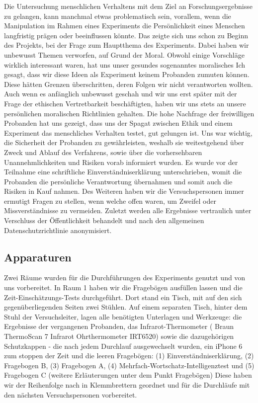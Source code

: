 \documentclass{Bericht}
\begin{document}
Die Untersuchung menschlichen Verhaltens mit dem Ziel an Forschungsergebnisse zu gelangen, kann manchmal etwas problematisch sein, vorallem, wenn die Manipulation im Rahmen eines Experiments die Persönlichkeit eines Menschen langfristig prägen oder beeinflussen könnte. Das zeigte sich uns schon zu Beginn des Projekts, bei der Frage zum Hauptthema des Experiments. Dabei haben wir unbewusst Themen verworfen, auf Grund der Moral. Obwohl einige Vorschläge wirklich interessant waren, hat uns unser gesundes sogenanntes moralisches Ich gesagt, dass wir diese Ideen als Experiment keinem Probanden zumuten können. Diese hätten Grenzen überschritten, deren Folgen wir nicht verantworten wollten. Auch wenn es anfänglich unbewusst geschah und wir uns erst später mit der Frage der ethischen Vertretbarkeit beschäftigten, haben wir uns stets an unsere persönlichen moralischen Richtlinien gehalten. Die hohe Nachfrage der freiwilligen Probanden hat uns gezeigt, dass uns der Spagat zwischen Ethik und einem Experiment  das menschliches Verhalten testet, gut gelungen ist. Uns war wichtig, die Sicherheit der Probanden zu gewährleisten, weshalb sie weitestgehend über Zweck und Ablauf des Verfahrens, sowie über die vorhersehbaren Unannehmlichkeiten und Risiken vorab informiert wurden. Es wurde vor der Teilnahme eine schriftliche Einverständniserklärung unterschrieben, womit die Probanden die persönliche Verantwortung übernahmen und somit auch die Risiken in Kauf nahmen. Des Weiteren haben wir die Versuchspersonen immer ermutigt Fragen zu stellen, wenn welche offen waren, um Zweifel oder Missverständnisse zu vermeiden. Zuletzt werden alle Ergebnisse vertraulich unter Verschluss der {\"O}ffentlichkeit behandelt und  nach den allgemeinen Datenschutzrichtlinie anonymisiert.

\subsection {Apparaturen}

Zwei Räume wurden für die Durchführungen des Experiments genutzt und von uns vorbereitet. In Raum 1 haben wir die Fragebögen ausfüllen lassen und die Zeit-Einschätzungs-Tests durchgeführt. Dort stand ein Tisch, mit auf den sich gegenüberliegenden Seiten zwei Stühlen. Auf einem separaten Tisch, hinter dem Stuhl der Versuchsleiter, lagen alle benötigten Unterlagen und Werkzeuge: die Ergebnisse der vergangenen Probanden, das Infrarot-Thermometer ( Braun ThermoScan 7 Infrarot Ohrthermometer IRT6520) sowie die dazugehörigen Schutzkappen - die nach jedem Durchlauf ausgewechselt wurden, ein iPhone 6 zum stoppen der Zeit und die leeren Fragebögen: (1) Einverständniserklärung, (2)  \glqq Fragebogen B\grqq{}, (3)  \glqq Fragebogen A\grqq{}, (4) Mehrfach-Wortschatz-Intelligenztest und (5)  \glqq Fragebogen C\grqq{} (weitere Erläuterungen unter dem Punkt  \glqq  Fragebögen\grqq{}) Diese haben wir der Reihenfolge nach in Klemmbrettern geordnet und für die Durchläufe mit den nächsten Versuchspersonen vorbereitet. 
\end{document}
